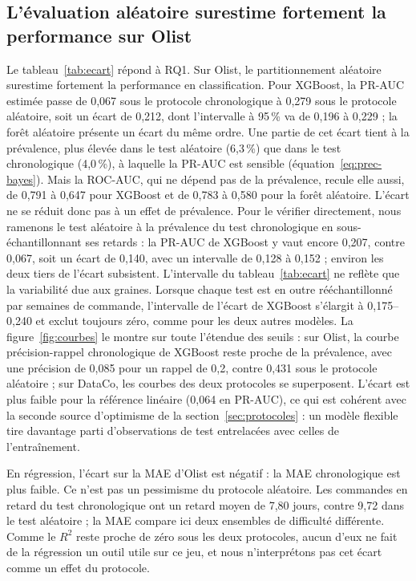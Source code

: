 \documentclass[11pt,a4paper]{article}
\theoremstyle{definition}
\begin{document}
\subsection{L'évaluation aléatoire surestime fortement la performance sur Olist}
\label{sec:res-ecart}

Le tableau~\ref{tab:ecart} répond à RQ1. Sur Olist, le partitionnement aléatoire surestime fortement la performance en classification. Pour XGBoost, la PR-AUC estimée passe de 0,067 sous le protocole chronologique à 0,279 sous le protocole aléatoire, soit un écart de 0,212, dont l'intervalle à 95\,\% va de 0,196 à 0,229 ; la forêt aléatoire présente un écart du même ordre. Une partie de cet écart tient à la prévalence, plus élevée dans le test aléatoire (6,3\,\%) que dans le test chronologique (4,0\,\%), à laquelle la PR-AUC est sensible (équation~\eqref{eq:prec-bayes}). Mais la ROC-AUC, qui ne dépend pas de la prévalence, recule elle aussi, de 0,791 à 0,647 pour XGBoost et de 0,783 à 0,580 pour la forêt aléatoire. L'écart ne se réduit donc pas à un effet de prévalence. Pour le vérifier directement, nous ramenons le test aléatoire à la prévalence du test chronologique en sous-échantillonnant ses retards : la PR-AUC de XGBoost y vaut encore 0,207, contre 0,067, soit un écart de 0,140, avec un intervalle de 0,128 à 0,152 ; environ les deux tiers de l'écart subsistent. L'intervalle du tableau~\ref{tab:ecart} ne reflète que la variabilité due aux graines. Lorsque chaque test est en outre rééchantillonné par semaines de commande, l'intervalle de l'écart de XGBoost s'élargit à 0,175--0,240 et exclut toujours zéro, comme pour les deux autres modèles. La figure~\ref{fig:courbes} le montre sur toute l'étendue des seuils : sur Olist, la courbe précision-rappel chronologique de XGBoost reste proche de la prévalence, avec une précision de 0,085 pour un rappel de 0,2, contre 0,431 sous le protocole aléatoire ; sur DataCo, les courbes des deux protocoles se superposent. L'écart est plus faible pour la référence linéaire (0,064 en PR-AUC), ce qui est cohérent avec la seconde source d'optimisme de la section~\ref{sec:protocoles} : un modèle flexible tire davantage parti d'observations de test entrelacées avec celles de l'entraînement.

En régression, l'écart sur la MAE d'Olist est négatif : la MAE chronologique est plus faible. Ce n'est pas un pessimisme du protocole aléatoire. Les commandes en retard du test chronologique ont un retard moyen de 7,80 jours, contre 9,72 dans le test aléatoire ; la MAE compare ici deux ensembles de difficulté différente. Comme le $R^2$ reste proche de zéro sous les deux protocoles, aucun d'eux ne fait de la régression un outil utile sur ce jeu, et nous n'interprétons pas cet écart comme un effet du protocole.
\end{document}
